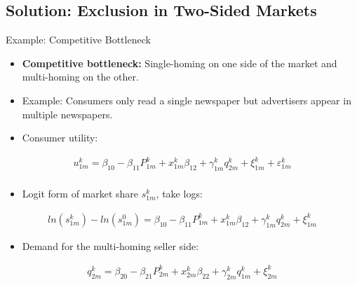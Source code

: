 \documentclass[aspectratio=169]{beamer}  %
\begin{document}
\subsection{Solution: Exclusion in Two-Sided Markets}
\begin{frame}{Example: Competitive Bottleneck}
    \begin{itemize}
        \item \textbf{Competitive bottleneck:} Single-homing on one side of the market and multi-homing on the other.
        \item Example: Consumers only read a single newspaper but advertisers appear in multiple newspapers.
        \item Consumer utility:
    \end{itemize}
    \vspace{-0.3cm}
    \begin{align*}
        u_{1m}^{k} = \beta_{10} - \beta_{11}P_{1m}^{k} + x_{1m}^{k}\beta_{12} + \gamma_{1m}^{k}q_{2m}^{k} + \xi_{1m}^{k} + \varepsilon_{1m}^{k} \\[5pt]
    \end{align*}
    \vspace{-1.3cm}
    \begin{itemize}
        \item Logit form of market share $s_{1m}^{k}$, take logs:
    \end{itemize}
    \vspace{-0.1cm}
    \begin{align*}
        ln(s_{1m}^{k}) - ln(s_{1m}^{0}) = \beta_{10} - \beta_{11}P_{1m}^{k} + x_{1m}^{k}\beta_{12} + \gamma_{1m}^{k}q_{2m}^{k} + \xi_{1m}^{k}
    \end{align*}
    \vspace{-0.5cm}
    \begin{itemize}
        \item Demand for the multi-homing seller side:
    \end{itemize}
    \begin{align*}
        q_{2m}^{k} = \beta_{20} - \beta_{21}P_{2m}^{k} + x_{2m}^{k}\beta_{22} + \gamma_{2m}^{k}q_{1m}^{k} + \xi_{2m}^{k}
    \end{align*}
\end{frame}
\end{document}
